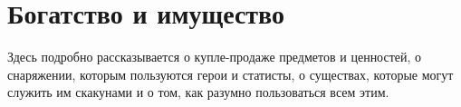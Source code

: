 \chapter{Богатство и имущество}
Здесь подробно рассказывается о купле-продаже предметов и ценностей, о снаряжении, которым пользуются герои и статисты, о существах, которые могут служить им скакунами и о том, как разумно пользоваться всем этим.







\ifx\islight\undefined



\fi
